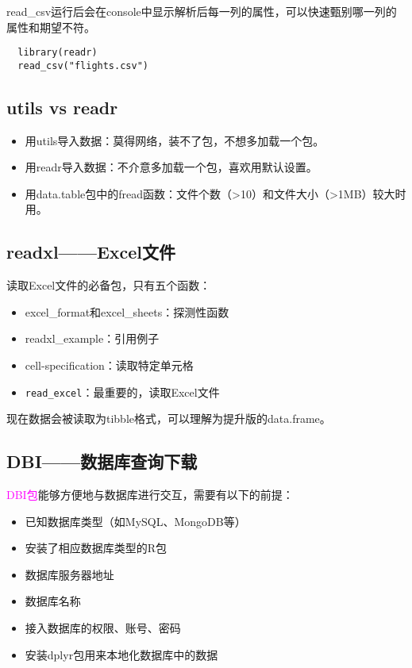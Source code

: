 \documentclass[cn,hazy,blue,14pt,screen]{elegantnote}
\begin{document}
read\_csv运行后会在console中显示解析后每一列的属性，可以快速甄别哪一列的属性和期望不符。

\begin{lstlisting}
  library(readr)
  read_csv("flights.csv")
\end{lstlisting}

\subsection{utils vs readr}

\begin{itemize}
  \item 用utils导入数据：莫得网络，装不了包，不想多加载一个包。
  \item 用readr导入数据：不介意多加载一个包，喜欢用默认设置。
  \item 用data.table包中的fread函数：文件个数（>10）和文件大小（>1MB）较大时用。
\end{itemize}

\subsection{readxl——Excel文件}

读取Excel文件的必备包，只有五个函数：

\begin{itemize}
  \item excel\_format和excel\_sheets：探测性函数
  \item readxl\_example：引用例子
  \item cell-specification：读取特定单元格
  \item \lstinline{read_excel}：最重要的，读取Excel文件
\end{itemize}

现在数据会被读取为tibble格式，可以理解为提升版的data.frame。

\subsection{DBI——数据库查询下载}

\textcolor{magenta}{DBI包}能够方便地与数据库进行交互，需要有以下的前提：
\begin{itemize}
  \item 已知数据库类型（如MySQL、MongoDB等）
  \item 安装了相应数据库类型的R包
  \item 数据库服务器地址
  \item 数据库名称
  \item 接入数据库的权限、账号、密码
  \item 安装dplyr包用来本地化数据库中的数据
\end{itemize}
\end{document}

